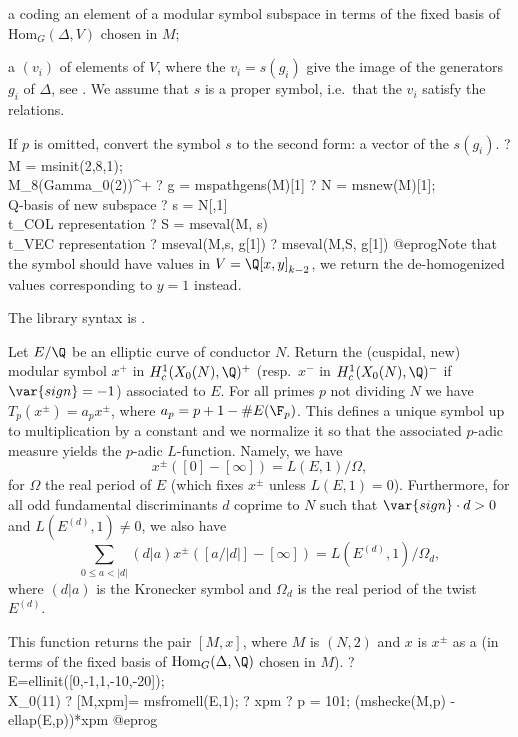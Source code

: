\item a  coding an element of a modular symbol subspace in terms of
the fixed basis of $\text{Hom}_G(\Delta,V)$ chosen in $M$;

\item a  $(v_i)$ of elements of $V$, where the $v_i = s(g_i)$ give
the image of the generators $g_i$ of $\Delta$, see .
We assume that $s$ is a proper symbol, i.e.~that the $v_i$ satisfy
the  relations.

If $p$ is omitted, convert the symbol $s$ to the second form: a vector of
the $s(g_i)$.
\bprog
? M = msinit(2,8,1); \\ M_8(Gamma_0(2))^+
? g = mspathgens(M)[1]
? N = msnew(M)[1]; \\ Q-basis of new subspace
? s = N[,1]         \\ t_COL representation
? S = mseval(M, s)   \\ t_VEC representation
? mseval(M,s, g[1])
? mseval(M,S, g[1])
@eprog\noindent Note that the symbol should have values in
$V = \Q[x,y]_{k-2}$, we return the de-homogenized values corresponding to $y
= 1$ instead.

The library syntax is .

\label{se:msfromell}
Let $E/\Q$ be an elliptic curve of conductor $N$. Return the (cuspidal,
new) modular symbol $x^+$ in $H^1_c(X_0(N),\Q)^+$ (resp.~$x^-$ in
$H^1_c(X_0(N),\Q)^-$ if $\var{sign} = -1$) associated to
$E$. For all primes $p$ not dividing $N$ we have
$T_p(x^\pm) =  a_p x^\pm$, where $a_p = p+1-\#E(\F_p)$.
This defines a unique symbol up to multiplication by a constant
and we normalize it so that the associated $p$-adic measure yields the
$p$-adic $L$-function. Namely, we have
$$ x^{\pm}([0]-[\infty]) = L(E,1) / \Omega,$$
for $\Omega$ the real period of $E$ (which fixes $x^{\pm}$ unless $L(E,1)=0$).
Furthermore, for all odd fundamental discriminants $d$ coprime to $N$ such
that $\var{sign}\cdot d > 0$ and $L(E^{(d)},1) \neq 0$, we also have
$$\sum_{0\leq a<|d|} (d|a) x^{\pm}([a/|d|]-[\infty])
   = L(E^{(d)},1) / \Omega_d,$$
where $(d|a)$ is the Kronecker symbol and $\Omega_d$ is the real
period of the twist $E^{(d)}$.

This function returns the pair $[M, x]$, where $M$ is
$(N,2)$ and $x$ is $x^\pm$ as a  (in terms
of the fixed basis of $\text{Hom}_G(\Delta,\Q)$ chosen in $M$).
\bprog
? E=ellinit([0,-1,1,-10,-20]);  \\ X_0(11)
? [M,xpm]= msfromell(E,1);
? xpm
? p = 101; (mshecke(M,p) - ellap(E,p))*xpm
@eprog

